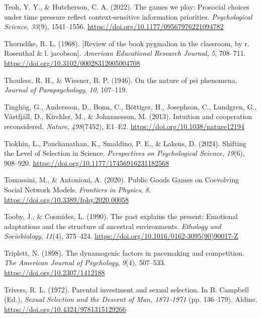 \documentclass[
  letterpaper,
]{book}
\newlength{\cslhangindent}
\newenvironment{CSLReferences}[2] %
 {\begin{list}{}{%
  \setlength{\itemindent}{0pt}
  \setlength{\leftmargin}{0pt}
  \setlength{\parsep}{0pt}
  \ifodd #1
   \setlength{\leftmargin}{\cslhangindent}
   \setlength{\itemindent}{-1\cslhangindent}
  \fi
  \setlength{\itemsep}{#2\baselineskip}}}
 {\end{list}}
\begin{document}
\begin{CSLReferences}{1}{0}
Teoh, Y. Y., \& Hutcherson, C. A. (2022). The games we play: {Prosocial}
choices under time pressure reflect context-sensitive information
priorities. \emph{Psychological Science}, \emph{33}(9), 1541--1556.
\url{https://doi.org/10.1177/09567976221094782}

Thorndike, R. L. (1968). {[}Review of the book pygmalion in the
classroom, by r. Rosenthal \& l. jacobson{]}. \emph{American Educational
Research Journal}, \emph{5}, 708--711.
\url{https://doi.org/10.3102/00028312005004708}

Thouless, R. H., \& Wiesner, B. P. (1946). On the nature of psi
phenomena. \emph{Journal of Parapsychology}, \emph{10}, 107--119.

Tinghög, G., Andersson, D., Bonn, C., Böttiger, H., Josephson, C.,
Lundgren, G., Västfjäll, D., Kirchler, M., \& Johannesson, M. (2013).
Intuition and cooperation reconsidered. \emph{Nature}, \emph{498}(7452),
E1--E2. \url{https://doi.org/10.1038/nature12194}

Tiokhin, L., Panchanathan, K., Smaldino, P. E., \& Lakens, D. (2024).
Shifting the {Level} of {Selection} in {Science}. \emph{Perspectives on
Psychological Science}, \emph{19}(6), 908--920.
\url{https://doi.org/10.1177/17456916231182568}

Tomassini, M., \& Antonioni, A. (2020). Public {Goods} {Games} on
{Coevolving} {Social} {Network} {Models}. \emph{Frontiers in Physics},
\emph{8}. \url{https://doi.org/10.3389/fphy.2020.00058}

Tooby, J., \& Cosmides, L. (1990). The past explains the present:
{Emotional} adaptations and the structure of ancestral environments.
\emph{Ethology and Sociobiology}, \emph{11}(4), 375--424.
\url{https://doi.org/10.1016/0162-3095(90)90017-Z}

Triplett, N. (1898). The dynamogenic factors in pacemaking and
competition. \emph{The American Journal of Psychology}, \emph{9}(4),
507--533. \url{https://doi.org/10.2307/1412188}

Trivers, R. L. (1972). Parental investment and sexual selection. In B.
Campbell (Ed.), \emph{Sexual {Selection} and the {Descent} of {Man},
1871-1971} (pp. 136--179). Aldine.
\url{https://doi.org/10.4324/9781315129266}


\end{CSLReferences}
\end{document}
